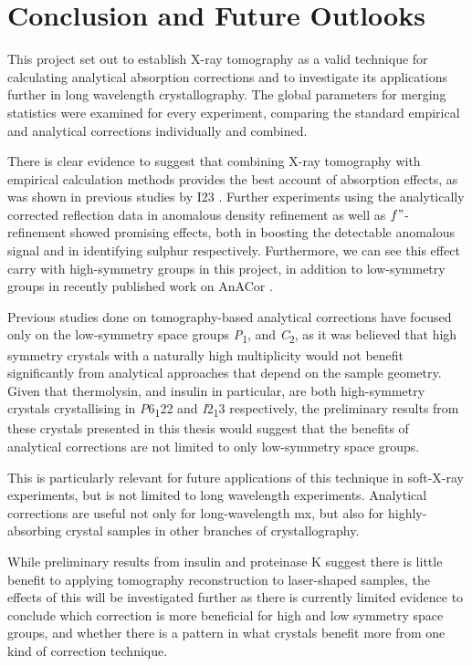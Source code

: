 \section{Conclusion and Future Outlooks}

This project set out to establish X-ray tomography as a valid technique for calculating analytical absorption corrections and to investigate its applications further in long wavelength crystallography. The global parameters for merging statistics were examined for every experiment, comparing the standard empirical and analytical corrections individually and combined.

There is clear evidence to suggest that combining X-ray tomography with empirical calculation methods provides the best account of absorption effects, as was shown in previous studies by I23 \cite{Kazantsev2021,Lu2024}. Further experiments using the analytically corrected reflection data in anomalous density refinement as well as $f"$-refinement showed promising effects, both in boosting the detectable anomalous signal and in identifying sulphur respectively.
Furthermore, we can see this effect carry with high-symmetry groups in this project, in addition to low-symmetry groups in recently published work on AnACor \cite{Lu2024}.%

Previous studies done on tomography-based analytical corrections have focused only on the low-symmetry space groups \textit{P}\textsubscript{1}, and \textit{C}\textsubscript{2}, as it was believed that high symmetry crystals with a naturally high multiplicity would not benefit significantly from analytical approaches that depend on the sample geometry. Given that thermolysin, and insulin in particular, are both high-symmetry crystals crystallising in \textit{P}6\textsubscript{1}22 and \textit{I}2\textsubscript{1}3 respectively, the preliminary results from these crystals presented in this thesis would suggest that the benefits of analytical corrections are not limited to only low-symmetry space groups.

This is particularly relevant for future applications of this technique in soft-X-ray experiments, but is not limited to long wavelength experiments. Analytical corrections are useful not only for long-wavelength \ac{mx}, but also for highly-absorbing crystal samples in other branches of crystallography.

While preliminary results from insulin and proteinase K suggest there is little benefit to applying tomography reconstruction to laser-shaped samples, the effects of this will be investigated further as there is currently limited evidence to conclude which correction is more beneficial for high and low symmetry space groups, and whether there is a pattern in what crystals benefit more from one kind of correction technique.

